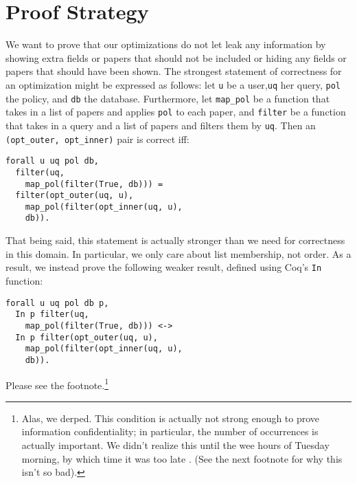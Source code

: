\documentclass[11pt,journal]{IEEEtran}
\begin{document}
\section{Proof Strategy}
\label{sec:proof_strategy}

We want to prove that our optimizations do not let leak any information by showing extra fields or papers that should not be included or hiding any fields or papers that should have been shown.  The strongest statement of correctness for an optimization might be expressed as follows: let \texttt{u} be a user,\texttt{uq} her query, \texttt{pol} the policy, and \texttt{db} the database.  Furthermore, let \texttt{map\_pol} be a function that takes in a list of papers and applies \texttt{pol} to each paper, and \texttt{filter} be a function that takes in a query and a list of papers and filters them by \texttt{uq}. Then an \texttt{(opt\_outer, opt\_inner)} pair is correct iff:
\begin{verbatim}
forall u uq pol db,
  filter(uq,
    map_pol(filter(True, db))) =
  filter(opt_outer(uq, u),
    map_pol(filter(opt_inner(uq, u),
    db)).
\end{verbatim}
That being said, this statement is actually stronger than we need for correctness in this domain.  In particular, we only care about list membership, not order.  As a result, we instead prove the following weaker result, defined using Coq's \texttt{In} function:
\begin{verbatim}
forall u uq pol db p,
  In p filter(uq,
    map_pol(filter(True, db))) <->
  In p filter(opt_outer(uq, u),
    map_pol(filter(opt_inner(uq, u),
    db)).
\end{verbatim}
Please see the footnote.\footnote{Alas, we derped. This condition is actually not strong enough to prove information confidentiality; in particular, the number of occurrences is actually important.  We didn't realize this until the wee hours of Tuesday morning, by which time it was too late \frownie{}. (See the next footnote for why this isn't so bad).}
\end{document}
